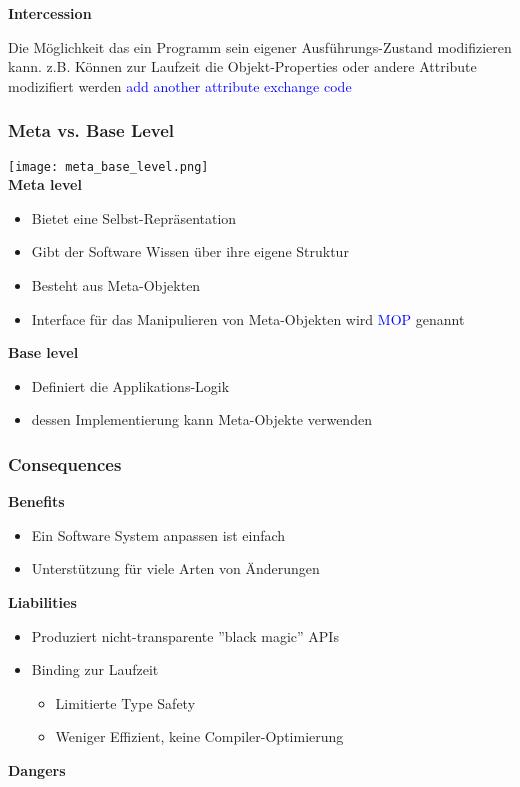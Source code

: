 \textbf{Intercession}

Die Möglichkeit das ein Programm sein eigener Ausführungs-Zustand modifizieren kann. z.B. Können zur Laufzeit die Objekt-Properties oder andere Attribute modizifiert werden \textcolor{blue}{add another attribute} \textcolor{blue}{exchange code}

\subsubsection{Meta vs. Base Level}

\texttt{[image: meta\_base\_level.png]} \\

\textbf{Meta level}
\begin{itemize}
    \item Bietet eine Selbst-Repräsentation
    \item Gibt der Software Wissen über ihre eigene Struktur
    \item Besteht aus Meta-Objekten
    \item Interface für das Manipulieren von Meta-Objekten wird \textcolor{blue}{MOP} genannt
\end{itemize}
\vspace{10pt}
\textbf{Base level}
\begin{itemize}
    \item Definiert die Applikations-Logik
    \item dessen Implementierung kann Meta-Objekte verwenden
\end{itemize}

\subsubsection{Consequences}
\textbf{Benefits}
\begin{itemize}
    \item Ein Software System anpassen ist einfach
    \item Unterstützung für viele Arten von Änderungen
\end{itemize}
\vspace{10pt}

\columnbreak

\textbf{Liabilities}
\begin{itemize}
    \item Produziert nicht-transparente ''black magic'' APIs
    \item Binding zur Laufzeit
    \begin{itemize}
        \item Limitierte Type Safety
        \item Weniger Effizient, keine Compiler-Optimierung
    \end{itemize}
\end{itemize}
\vspace{10pt}
\textbf{Dangers}

